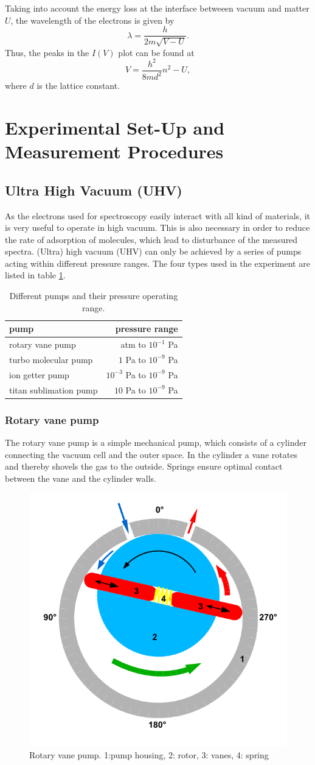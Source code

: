 \documentclass[a4paper]{scrartcl}
\numberwithin{equation}{section}
\numberwithin{figure}{section}
\numberwithin{table}{section}
\newcommand{\eq}[2]{\begin{equation}#1\label{#2}\end{equation}}
\begin{document}
Taking into account the energy loss at the interface betweeen vacuum and matter $U$, the wavelength of the electrons is given by
\eq{\lambda = \frac{h}{2m\sqrt{V-U}}.}{}
Thus, the peaks in the $I(V)$ plot can be found at
\eq{V=\frac{h^2}{8md^2}n^2-U,}{}
where $d$ is the lattice constant.


\section{Experimental Set-Up and Measurement Procedures}

\subsection{Ultra High Vacuum (UHV)}
As the electrons used for spectroscopy easily interact with all kind of materials, it is very useful to operate in high vacuum. This is also necessary in order to reduce the rate of adsorption of molecules, which lead to disturbance of the measured spectra. (Ultra) high  vacuum (UHV) can only be achieved by a series of pumps acting within different pressure ranges. The four types used in the experiment are listed in table \ref{tab:pump}.
\begin{table}
\centering
\begin{tabular}{lr}
\toprule
pump & pressure range \\
\midrule
rotary vane pump & atm to $10^{-1}$ Pa \\ %
turbo molecular pump &  $1$ Pa to $10^{-9}$ Pa \\
ion getter pump  & $ 10^{-3}$ Pa to $10^{-9}$ Pa \\
titan sublimation pump & $10$ Pa to $10^{-9}$ Pa \\
\bottomrule
\end{tabular}
\caption{Different pumps and their pressure operating range.}
\label{tab:pump}
\end{table}

\subsubsection{Rotary vane pump}
The rotary vane pump is a simple mechanical pump, which consists of a cylinder connecting the vacuum cell and the outer space. In the cylinder a vane rotates and thereby shovels the gas to the outside. Springs ensure optimal contact between the vane and the cylinder walls. 

\begin{figure}
  \centering
   	\includegraphics[width=0.3\linewidth]{pic/rot.png}

 \caption{\small Rotary vane pump. 1:pump housing, 2: rotor, 3: vanes, 4: spring}
        \label{fig:rot}
\end{figure}
\end{document}
